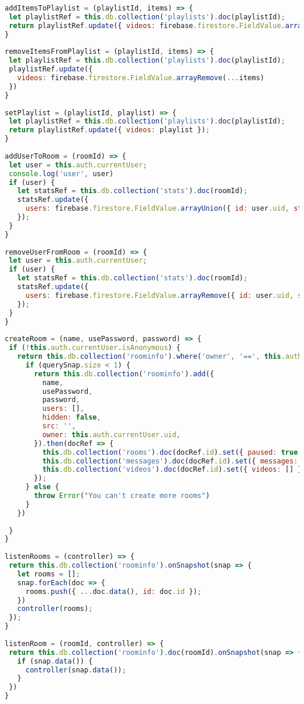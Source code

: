 \begin{lstlisting}[language=JavaScript,label={lst:firebase},caption={Методы для взаимодействия с Firebase}]
addItemsToPlaylist = (playlistId, items) => {
 let playlistRef = this.db.collection('playlists').doc(playlistId);
 return playlistRef.update({ videos: firebase.firestore.FieldValue.arrayUnion(...items) });
}
 
removeItemsFromPlaylist = (playlistId, items) => {
 let playlistRef = this.db.collection('playlists').doc(playlistId);
 playlistRef.update({
   videos: firebase.firestore.FieldValue.arrayRemove(...items)
 })
}
 
setPlaylist = (playlistId, playlist) => {
 let playlistRef = this.db.collection('playlists').doc(playlistId);
 return playlistRef.update({ videos: playlist });
}
 
addUserToRoom = (roomId) => {
 let user = this.auth.currentUser;
 console.log('user', user)
 if (user) {
   let statsRef = this.db.collection('stats').doc(roomId);
   statsRef.update({
     users: firebase.firestore.FieldValue.arrayUnion({ id: user.uid, status: null })
   });
 }
}
 
removeUserFromRoom = (roomId) => {
 let user = this.auth.currentUser;
 if (user) {
   let statsRef = this.db.collection('stats').doc(roomId);
   statsRef.update({
     users: firebase.firestore.FieldValue.arrayRemove({ id: user.uid, status: null })
   });
 }
}
 
createRoom = (name, usePassword, password) => {
 if (!this.auth.currentUser.isAnonymous) {
   return this.db.collection('roominfo').where('owner', '==', this.auth.currentUser.uid).get().then((querySnap) => {
     if (querySnap.size < 1) {
       return this.db.collection('roominfo').add({
         name,
         usePassword,
         password,
         users: [],
         hidden: false,
         src: '',
         owner: this.auth.currentUser.uid,
       }).then(docRef => {
         this.db.collection('rooms').doc(docRef.id).set({ paused: true, src: '', time: 0, })
         this.db.collection('messages').doc(docRef.id).set({ messages: [] });
         this.db.collection('videos').doc(docRef.id).set({ videos: [] });
       });
     } else {
       throw Error("You can't create more rooms")
     }
   })
 
 }
}
 
listenRooms = (controller) => {
 return this.db.collection('roominfo').onSnapshot(snap => {
   let rooms = [];
   snap.forEach(doc => {
     rooms.push({ ...doc.data(), id: doc.id });
   })
   controller(rooms);
 });
}
 
listenRoom = (roomId, controller) => {
 return this.db.collection('roominfo').doc(roomId).onSnapshot(snap => {
   if (snap.data()) {
     controller(snap.data());
   }
 })
}
 

\end{lstlisting}
